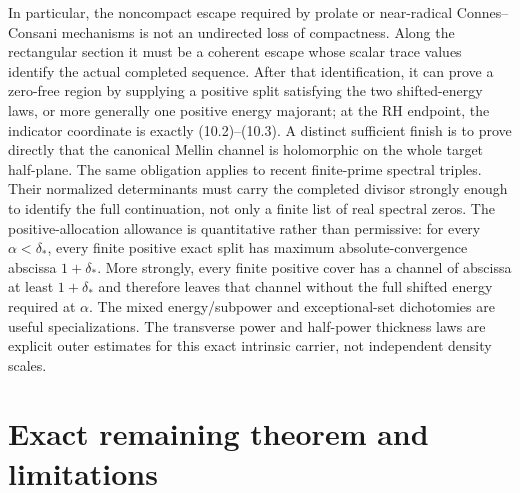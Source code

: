 \documentclass[11pt]{article}
\begin{document}
In particular, the noncompact escape required by prolate or near-radical Connes--Consani
mechanisms is not an undirected loss of compactness.  Along the rectangular section it must be a
coherent escape whose scalar trace values identify the actual completed sequence.  After that
identification, it can prove a zero-free region by supplying a positive split satisfying the two
shifted-energy laws, or more generally one positive energy majorant; at the RH endpoint, the
indicator coordinate is exactly (10.2)--(10.3).  A distinct
sufficient finish is to prove directly that the canonical Mellin channel is holomorphic on the
whole target half-plane.  The same obligation applies to recent
finite-prime spectral triples.  Their normalized determinants must carry the completed divisor
strongly enough to identify the full continuation, not only a finite list of real spectral zeros.
The positive-allocation allowance is quantitative rather than permissive: for every
$\alpha<\delta_*$, every finite positive exact split has maximum absolute-convergence abscissa
$1+\delta_*$.  More strongly, every finite positive cover has a channel of abscissa at least
$1+\delta_*$ and therefore leaves that channel without the full shifted energy required at
$\alpha$.  The mixed energy/subpower and exceptional-set dichotomies are useful specializations.
The transverse power and half-power thickness laws are explicit outer estimates for this exact
intrinsic carrier, not independent density scales.

\section{Exact remaining theorem and limitations}
\end{document}
